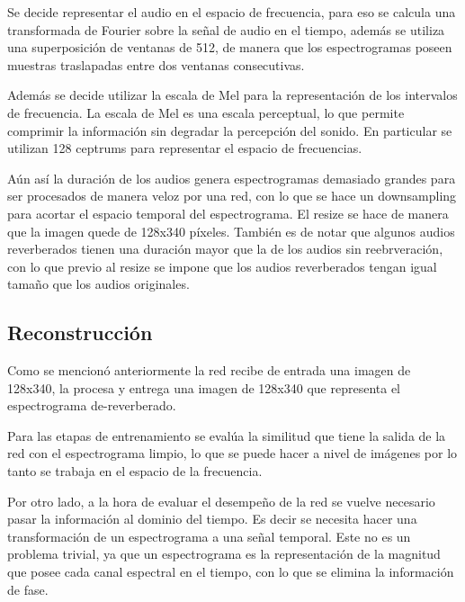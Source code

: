 Se decide representar el audio en el espacio de frecuencia, para eso se calcula una transformada de Fourier sobre la señal de audio en el tiempo, además se utiliza una superposición de ventanas de 512, de manera que los espectrogramas poseen muestras traslapadas entre dos ventanas consecutivas.

Además se decide utilizar la escala de Mel para la representación de los intervalos de frecuencia. La escala de Mel es una escala perceptual, lo que permite comprimir la información sin degradar la percepción del sonido. En particular se utilizan 128 ceptrums para representar el espacio de frecuencias.


Aún así la duración de los audios genera espectrogramas demasiado grandes para ser procesados de manera veloz por una red, con lo que se hace un downsampling para acortar el espacio temporal del espectrograma. El resize se hace de manera que la imagen quede de 128x340 píxeles.
También es de notar que algunos audios reverberados tienen una duración mayor que la de los audios sin reebrveración, con lo que previo al resize se impone que los audios reverberados tengan igual tamaño que los audios originales.


\subsection{Reconstrucción}
Como se mencionó anteriormente la red recibe de entrada una imagen de 128x340, la procesa y entrega una imagen de 128x340 que representa el espectrograma de-reverberado. 

Para las etapas de entrenamiento se evalúa la similitud que tiene la salida de la red con el espectrograma limpio, lo que se puede hacer a nivel de imágenes por lo tanto se trabaja en el espacio de la frecuencia.

Por otro lado, a la hora de evaluar el desempeño de la red se vuelve necesario pasar la información al dominio del tiempo. Es decir se necesita hacer una transformación de un espectrograma a una señal temporal. Este no es un problema trivial, ya que un espectrograma es la representación de la magnitud que posee cada canal espectral en el tiempo, con lo que se elimina la información de fase.

